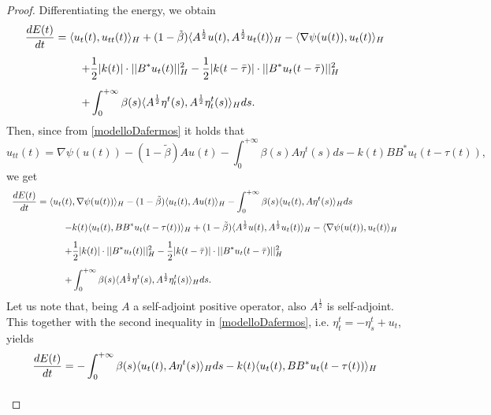 \documentclass[11pt]{article}
\begin{document}
\begin{proof}
	Differentiating the energy, we obtain
	$$
	\begin{array}{l}
		\vspace{0.3cm}
		\displaystyle{\frac{dE(t)}{dt}=\langle u_t(t),u_{tt}(t)\rangle_H+(1-\tilde{\beta})\langle A^{\frac 1 2}u(t),A^{\frac 1 2} u_t(t) \rangle_H -\langle \nabla \psi (u(t)), u_t(t)\rangle_H  }\\
		\vspace{0.3cm}
		\displaystyle{\hspace{1.8 cm}+\frac{1}{2} |k(t)|\cdot ||B^*u_t(t)||_H^2-\frac{1}{2}|k(t-\bar{\tau})|\cdot ||B^*u_t(t-\bar\tau)||_H^2}\\
		\displaystyle{\hspace{1.8 cm}+\int_0^{+\infty} \beta (s) \langle A^{\frac 12}\eta^t(s),A^{\frac 1 2}\eta^t_t(s) \rangle_H ds.}
	\end{array}
	$$
	Then, since from \eqref{modelloDafermos} it holds that
	$$u_{tt}(t)=\nabla\psi(u(t))-(1-\tilde{\beta})Au(t)-\int_{0}^{+\infty}\beta(s)A\eta^t(s)ds-k(t)BB^*u_t(t-\tau(t)),$$
	we get
	$$
	\begin{array}{l}
		\vspace{0.3cm}\displaystyle{\frac{dE(t)}{dt}=\langle u_t(t),\nabla\psi(u(t))\rangle_H-(1-\tilde{\beta})\langle u_t(t),Au(t)\rangle_H-\int_{0}^{+\infty}\beta(s)\langle u_t(t),A\eta^t(s)\rangle_Hds}\\
		\vspace{0.3cm}\displaystyle{\hspace{2 cm}-k(t)\langle u_t(t),BB^*u_t(t-\tau(t))\rangle_H+(1-\tilde{\beta})\langle A^{\frac 1 2}u(t),A^{\frac 1 2} u_t(t) \rangle_H -\langle \nabla \psi (u(t)), u_t(t)\rangle_H }\\
		\vspace{0.3cm}\displaystyle{\hspace{2cm}+\frac{1}{2} |k(t)|\cdot ||B^*u_t(t)||_H^2-\frac{1}{2}|k(t-\bar{\tau})|\cdot ||B^*u_t(t-\bar\tau)||_H^2}\\
		\displaystyle{\hspace{2cm}+\int_0^{+\infty} \beta (s) \langle A^{\frac 12}\eta^t(s),A^{\frac 1 2}\eta^t_t(s) \rangle_H ds.}
	\end{array}
	$$
	Let us note that, being $A$ a self-adjoint positive operator, also $A^{\frac{1}{2}}$ is self-adjoint. This together with the second inequality in \eqref{modelloDafermos}, i.e. $\eta_t^t=-\eta_s^t+u_t$, yields
		$$
	\begin{array}{l}
		\vspace{0.3cm}\displaystyle{\frac{dE(t)}{dt}=-\int_{0}^{+\infty}\beta(s)\langle u_t(t),A\eta^t(s)\rangle_Hds-k(t)\langle u_t(t),BB^*u_t(t-\tau(t))\rangle_H}\\

\end{array}$$
\end{proof}
\end{document}
